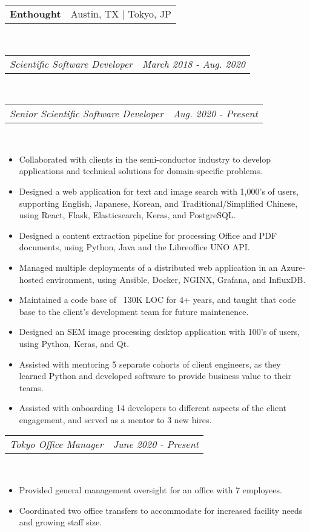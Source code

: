 \documentclass{article}
\makeatletter
\newcommand{\subheading}[2]{
	\begin{tabular*}{\textwidth}{l@{\extracolsep{\fill}}r}
		\textbf{#1} & #2 \\
	\end{tabular*} \\
}
\newcommand{\itemheading}[2]{
	\vspace{0.2em}
	\begin{tabular*}{\textwidth}{l@{\extracolsep{\fill}}r}
		\textit{#1} & \textit{#2} \\
	\end{tabular*} \\
	\vspace{-0.5em}
}
\makeatother
\begin{document}
\subheading{Enthought}{Austin, TX | Tokyo, JP}
\itemheading{Scientific Software Developer}{March 2018 - Aug. 2020}
\vspace{0.5em}
\itemheading{Senior Scientific Software Developer}{Aug. 2020 - Present}
\begin{itemize}
	\item Collaborated with clients in the semi-conductor industry to develop
	      applications and technical solutions for domain-specific problems.
	\item Designed a web application for text and image search with 1,000's of
	      users, supporting English, Japanese, Korean, and
		  Traditional/Simplified Chinese, using React, Flask, Elasticsearch,
		  Keras, and PostgreSQL.
	\item Designed a content extraction pipeline for processing Office and PDF
	      documents, using Python, Java and the Libreoffice UNO API.
	\item Managed multiple deployments of a distributed web application in an
	      Azure-hosted environment, using Ansible, Docker, NGINX, Grafana, and
		  InfluxDB.
	\item Maintained a code base of ~130K LOC for 4+ years, and taught that
	      code base to the client's development team for future maintenence.
	\item Designed an SEM image processing desktop application with 100's of
	      users, using Python, Keras, and Qt.
	\item Assisted with mentoring 5 separate cohorts of client engineers, as
		  they learned Python and developed software to provide business value
		  to their teams.
	\item Assisted with onboarding 14 developers to different aspects of the
	      client engagement, and served as a mentor to 3 new hires.
\end{itemize}
\itemheading{Tokyo Office Manager}{June 2020 - Present}
\begin{itemize}
	\item Provided general management oversight for an office with 7
		  employees.
	\item Coordinated two office transfers to accommodate for increased
		  facility needs and growing staff size.
\end{itemize}
\end{document}
